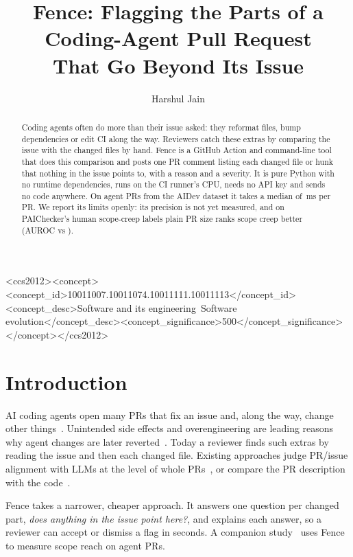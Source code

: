 \documentclass[sigconf]{acmart}
\begin{document}
\title{Fence: Flagging the Parts of a Coding-Agent Pull Request\\That Go Beyond Its Issue}
\author{Harshul Jain}
\begin{abstract}
Coding agents often do more than their issue asked: they reformat files, bump dependencies or edit CI along the way. Reviewers catch these extras by comparing the issue with the changed files by hand. Fence is a GitHub Action and command-line tool that does this comparison and posts one PR comment listing each changed file or hunk that nothing in the issue points to, with a reason and a severity. It is pure Python with no runtime dependencies, runs on the CI runner's CPU, needs no API key and sends no code anywhere. On \latN{} agent PRs from the AIDev dataset it takes a median of \latMedian{}\,ms per PR. We report its limits openly: its precision is not yet measured, and on PAIChecker's human scope-creep labels plain PR size ranks scope creep better (AUROC \aucSize{} vs \aucFence).
\end{abstract}
\begin{CCSXML}
<ccs2012><concept><concept_id>10011007.10011074.10011111.10011113</concept_id><concept_desc>Software and its engineering~Software evolution</concept_desc><concept_significance>500</concept_significance></concept></ccs2012>
\end{CCSXML}
\maketitle

\section{Introduction}
AI coding agents open many PRs that fix an issue and, along the way, change other things~\cite{li2026aidev}. Unintended side effects and overengineering are leading reasons why agent changes are later reverted~\cite{oukhay2026revert}. Today a reviewer finds such extras by reading the issue and then each changed file. Existing approaches judge PR/issue alignment with LLMs at the level of whole PRs~\cite{isik2025forge,altunhan2026finetune,wang2026paichecker}, or compare the PR description with the code~\cite{gong2026prmci}.

Fence takes a narrower, cheaper approach. It answers one question per changed part, \emph{does anything in the issue point here?}, and explains each answer, so a reviewer can accept or dismiss a flag in seconds. A companion study~\cite{fencestudy} uses Fence to measure scope reach on \nCorpus{} agent PRs.
\end{document}
